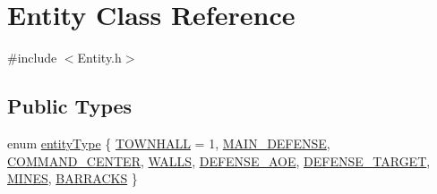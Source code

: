\hypertarget{class_entity}{}\section{Entity Class Reference}
\label{class_entity}


{\ttfamily \#include $<$Entity.\+h$>$}

\subsection*{Public Types}
\begin{DoxyCompactItemize}
\item 
enum \mbox{\hyperlink{class_entity_afd4a8ca3ac152f193c21d6a5100f1192}{entity\+Type}} \{ \newline
\mbox{\hyperlink{class_entity_afd4a8ca3ac152f193c21d6a5100f1192afa79e0a094e8734f6a69e5476ddd5823}{T\+O\+W\+N\+H\+A\+LL}} = 1, 
\mbox{\hyperlink{class_entity_afd4a8ca3ac152f193c21d6a5100f1192ad5d5e19857657aa249a7b10ad344de43}{M\+A\+I\+N\+\_\+\+D\+E\+F\+E\+N\+SE}}, 
\mbox{\hyperlink{class_entity_afd4a8ca3ac152f193c21d6a5100f1192a8f6ec264151aa1592f244af9d114cc73}{C\+O\+M\+M\+A\+N\+D\+\_\+\+C\+E\+N\+T\+ER}}, 
\mbox{\hyperlink{class_entity_afd4a8ca3ac152f193c21d6a5100f1192a753243231ffada457bdba1fc9c17df1c}{W\+A\+L\+LS}}, 
\newline
\mbox{\hyperlink{class_entity_afd4a8ca3ac152f193c21d6a5100f1192a4c15edacbb31fef7cf08bc3c36f91d4c}{D\+E\+F\+E\+N\+S\+E\+\_\+\+A\+OE}}, 
\mbox{\hyperlink{class_entity_afd4a8ca3ac152f193c21d6a5100f1192a1ff369bdb3fb61b3ecce2ca2d9b9f98b}{D\+E\+F\+E\+N\+S\+E\+\_\+\+T\+A\+R\+G\+ET}}, 
\mbox{\hyperlink{class_entity_afd4a8ca3ac152f193c21d6a5100f1192a7fb1e7b7efaa8f16d93200c255dff653}{M\+I\+N\+ES}}, 
\mbox{\hyperlink{class_entity_afd4a8ca3ac152f193c21d6a5100f1192a8cc861dde9f75c57766f2d2ab2541da4}{B\+A\+R\+R\+A\+C\+KS}}
 \}
\end{DoxyCompactItemize}

